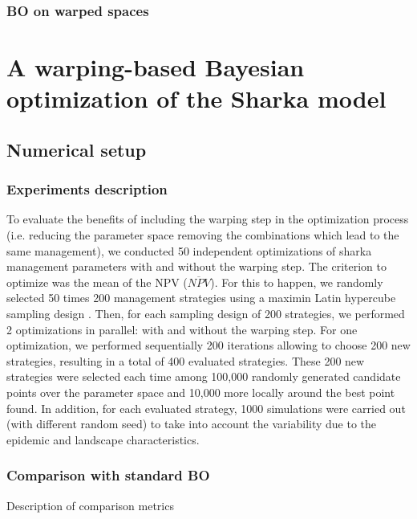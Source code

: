 \subsubsection{BO on warped spaces}

\section{A warping-based Bayesian optimization of the Sharka model}

\subsection{Numerical setup}

\subsubsection{Experiments description}

To evaluate the benefits of including the warping step in the optimization process (i.e. reducing the parameter space removing the combinations which lead to the same management), 
we conducted 50 independent optimizations of sharka management parameters with and without the warping step. The criterion to optimize was the mean of the NPV ($\overline{NPV}$).
For this to happen, we randomly selected 50 times 200 management strategies using a maximin Latin hypercube sampling design \cite{fang2005design}. 
Then, for each sampling design of 200 strategies, we performed 2 optimizations in parallel: with and without the warping step. 
For one optimization, we performed sequentially 200 iterations allowing to choose 200 new strategies, resulting in a total of 400 evaluated strategies.
These 200 new strategies were selected each time among 100,000 randomly generated candidate points over the parameter space and 10,000 more locally around the best point found. 
In addition, for each evaluated strategy, 1000 simulations were carried out (with different random seed) to take into account the variability due to the epidemic and landscape characteristics.

\subsubsection{Comparison with standard BO}

Description of comparison metrics


